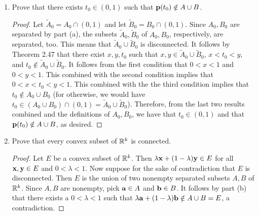 \documentclass[../psets.tex]{subfiles}
\begin{document}
\begin{enumerate}[label={\textbf{\arabic*.}}]
\begin{enumerate}
\begin{proof}
\begin{align*}
                &= \norm{(s-t)\ab-(s-t)\bb}\\
                &= |s-t|\cdot\norm{\ab-\bb}\\
                &< \frac{r}{\norm{\ab-\bb}}\cdot\norm{\ab-\bb}\\
                &= r
            \end{align*}
            so $\pp(s)\in N_r[\pp(t)]$. It follows from the second condition that $\pp(s)\in B$. It follows from the third condition that $\pp(s)\neq\pp(t)$. These last three results combined imply that $\pp(s)\in N_r[\pp(t)]\cap(B\setminus\{\pp(t)\})$. Therefore, $\pp(t)\in B'$, as desired. This combined with the fact that $\pp(t)\in A$ implies that
            \begin{equation*}
                A\cap\bar{B} \supset A\cap B'
                \supset \{\pp(t)\}
                \neq \emptyset
            \end{equation*}
            so $A$ and $B$ are not separated, a contradiction. The proof that $\bar{A}_0\cap B=\emptyset$ is symmetric.
        \end{proof}
        \item Prove that there exists $t_0\in(0,1)$ such that $\mathbf{p}(t_0)\notin A\cup B$.
        \begin{proof}
            Let $\tilde{A}_0=A_0\cap(0,1)$ and let $\tilde{B}_0=B_0\cap(0,1)$. Since $A_0,B_0$ are separated by part (a), the subsets $\tilde{A}_0,\tilde{B}_0$ of $A_0,B_0$, respectively, are separated, too. This means that $\tilde{A}_0\cup\tilde{B}_0$ is disconnected. It follows by Theorem 2.47 that there exist $x,y,t_0$ such that $x,y\in\tilde{A}_0\cup\tilde{B}_0$, $x<t_0<y$, and $t_0\notin\tilde{A}_0\cup\tilde{B}_0$. It follows from the first condition that $0<x<1$ and $0<y<1$. This combined with the second condition implies that $0<x<t_0<y<1$. This combined with the the third condition implies that $t_0\notin A_0\cup B_0$ (for otherwise, we would have $t_0\in(A_0\cup B_0)\cap(0,1)=\tilde{A}_0\cup\tilde{B}_0$). Therefore, from the last two results combined and the definitions of $A_0,B_0$, we have that $t_0\in(0,1)$ and that $\mathbf{p}(t_0)\notin A\cup B$, as desired.
        \end{proof}
        \item Prove that every convex subset of $\mathbb{R}^k$ is connected.
        \begin{proof}
            Let $E$ be a convex subset of $\mathbb{R}^k$. Then $\lambda\mathbf{x}+(1-\lambda)\mathbf{y}\in E$ for all $\mathbf{x},\mathbf{y}\in E$ and $0<\lambda<1$. Now suppose for the sake of contradiction that $E$ is disconnected. Then $E$ is the union of two nonempty separated subsets $A,B$ of $\mathbb{R}^k$. Since $A,B$ are nonempty, pick $\mathbf{a}\in A$ and $\mathbf{b}\in B$. It follows by part (b) that there exists a $0<\lambda<1$ such that $\lambda\mathbf{a}+(1-\lambda)\mathbf{b}\notin A\cup B=E$, a contradiction.

\end{proof}
\end{enumerate}
\end{enumerate}
\end{document}
